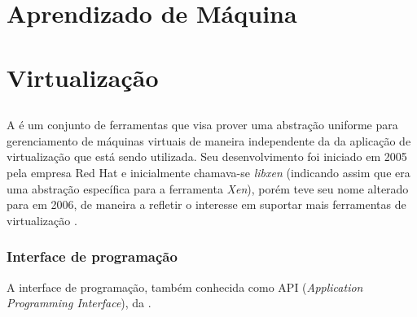 %
%

\chapter{Aprendizado de Máquina}\label{sec:aprendizado}



\chapter{Virtualização}\label{sec:virt}



\section{\libvirt}\label{sec:libvirt}


A \libvirt{} é um conjunto de ferramentas que visa prover uma abstração
uniforme para gerenciamento de máquinas virtuais de maneira independente da
da aplicação de virtualização que está sendo utilizada. Seu desenvolvimento
foi iniciado em 2005 pela empresa Red Hat e inicialmente chamava-se
\emph{libxen} (indicando assim que era uma abstração específica para a
ferramenta \emph{Xen}), porém teve seu nome alterado para \libvirt{} em
2006, de maneira a refletir o interesse em suportar mais ferramentas de
virtualização .

\subsection{Interface de programação}\label{sec:libvirtapi}

A interface de programação, também conhecida como API (\emph{Application
Programming Interface}), da \libvirt{}. %


